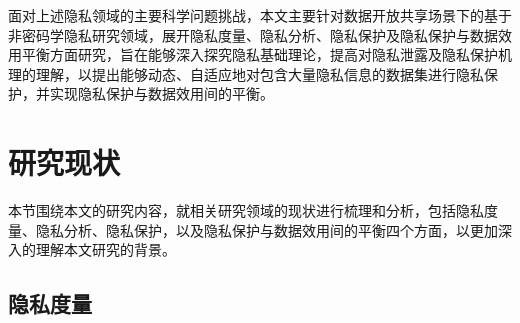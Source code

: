 面对上述隐私领域的主要科学问题挑战，本文主要针对数据开放共享场景下的基于非密码学隐私研究领域，展开隐私度量、隐私分析、隐私保护及隐私保护与数据效用平衡方面研究，旨在能够深入探究隐私基础理论，提高对隐私泄露及隐私保护机理的理解，以提出能够动态、自适应地对包含大量隐私信息的数据集进行隐私保护，并实现隐私保护与数据效用间的平衡。
\section{研究现状}

本节围绕本文的研究内容，就相关研究领域的现状进行梳理和分析，包括隐私度量、隐私分析、隐私保护，以及隐私保护与数据效用间的平衡四个方面，以更加深入的理解本文研究的背景。

\subsection{隐私度量}
